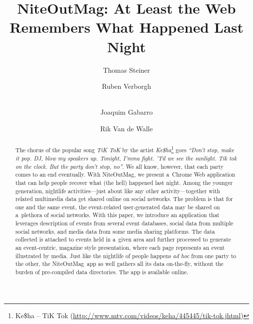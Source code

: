 \documentclass[runningheads,a4paper]{llncs}
\begin{document}
\title{NiteOutMag: At Least the Web\\ Remembers What Happened Last Night}

\author{Thomas Steiner \and
		Ruben Verborgh \and \\
		Joaquim Gabarro \and 
		Rik Van de Walle		
}


\maketitle
\setcounter{footnote}{0}

\begin{abstract}
The chorus of the popular song \emph{TiK ToK} by the artist \emph{Ke\$ha}\footnote{Ke\$ha -- TiK Tok (\url{http://www.mtv.com/videos/keha/445445/tik-tok.jhtml})} goes \emph{``Don't stop, make it pop. DJ, blow my speakers up. Tonight, I'mma fight. 'Til we see the sunlight. Tik tok on the clock. But the party don't stop, no''}. We all know, however, that each party comes to an end eventually. With NiteOutMag, we present a~Chrome Web application that can help people recover what (the hell) happened last night. Among the younger generation, nightlife activities---just about like any other activity---together with related multimedia data get shared online on social networks. The problem is that for one and the same event, the event-related user-generated data may be shared on a~plethora of social networks. With this paper, we introduce an application that leverages description of events from several event databases, social data from multiple social networks, and media data from some media sharing platforms. The data collected is attached to events held in a~given area and further processed to generate an event-centric, magazine style presentation, where each page represents an event illustrated by media. Just like the nightlife of people happens \emph{ad hoc} from one party to the other, the NiteOutMag~app as well gathers all its data on-the-fly, without the burden of pre-compiled data directories. The app is available online.
\end{abstract}
\end{document}
